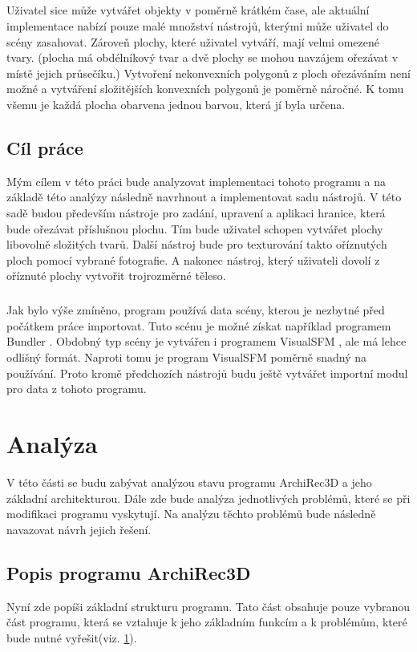 \documentclass[11pt,twoside,a4paper]{book}
\begin{document}
\paragraph{}
Uživatel sice může vytvářet objekty v poměrně krátkém čase, ale aktuální implementace nabízí pouze malé množství nástrojů, kterými může uživatel do scény zasahovat. Zároveň plochy, které uživatel vytváří, mají velmi omezené tvary. (plocha má obdélníkový tvar a dvě plochy se mohou navzájem ořezávat v místě jejich průsečíku.) Vytvoření nekonvexních polygonů z ploch ořezáváním není možné a vytváření složitějších konvexních polygonů je poměrně náročné. K tomu všemu je každá plocha obarvena jednou barvou, která jí byla určena.

\section{Cíl práce}
\label{cil}  
Mým cílem v této práci bude analyzovat implementaci tohoto programu a na základě této analýzy následně navrhnout a implementovat sadu nástrojů. V této sadě budou především nástroje pro zadání, upravení a aplikaci hranice, která bude ořezávat příslušnou plochu. Tím bude uživatel schopen vytvářet plochy libovolně složitých tvarů. Další nástroj bude pro texturování takto oříznutých ploch pomocí vybrané fotografie.  A nakonec nástroj, který uživateli dovolí z oříznuté plochy vytvořit trojrozměrné těleso.
\paragraph{}
Jak bylo výše zmíněno, program používá data scény, kterou je nezbytné před počátkem práce importovat. Tuto scénu je možné získat například programem Bundler \cite{Snavely}. Obdobný typ scény je vytvářen i programem VisualSFM \cite{SFM} \cite{MBA}, ale má lehce odlišný formát. Naproti tomu je program VisualSFM poměrně snadný na používání. Proto kromě předchozích nástrojů budu ještě vytvářet importní modul pro data z tohoto programu.

%
%
%
\chapter{Analýza}
V této části se budu zabývat analýzou stavu programu ArchiRec3D a jeho základní architekturou. Dále zde bude analýza jednotlivých problémů, které se při modifikaci programu vyskytují. Na analýzu těchto problémů bude následně navazovat návrh jejich řešení.

\section{Popis programu ArchiRec3D}
Nyní zde popíši základní strukturu programu. Tato část obsahuje pouze vybranou část programu, která se vztahuje k jeho základním funkcím a k problémům, které bude nutné vyřešit(viz. \ref{cil}). 
\end{document}
